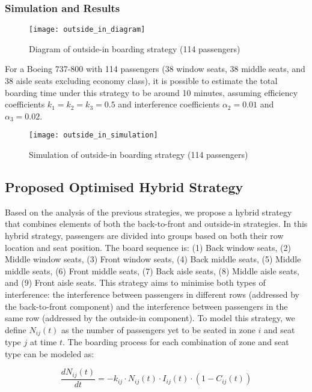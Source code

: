 \documentclass[12pt]{article}
\begin{document}
\subsubsection{Simulation and Results}

\begin{figure}[h]
    \centering
    \texttt{[image: outside\_in\_diagram]}
    \caption{Diagram of outside-in boarding strategy (114 passengers)}
    \label{fig:outside_in_diagram}
\end{figure}

For a Boeing 737-800 with 114 passengers (38 window seats, 38 middle seats, and 38 aisle seats excluding economy class), it is possible to estimate the total boarding time under this strategy to be around 10 minutes, assuming efficiency coefficients $k_1 = k_2 = k_3 = 0.5$ and interference coefficients $\alpha_2 = 0.01$ and $\alpha_3 = 0.02$.

\begin{figure}[h]
    \centering
    \texttt{[image: outside\_in\_simulation]}
    \caption{Simulation of outside-in boarding strategy (114 passengers)}
    \label{fig:outside_in_simulation}
\end{figure}

\subsection{Proposed Optimised Hybrid Strategy}

Based on the analysis of the previous strategies, we propose a hybrid strategy that combines elements of both the back-to-front and outside-in strategies. In this hybrid strategy, passengers are divided into groups based on both their row location and seat position. The board sequence is: (1) Back window seats, (2) Middle window seats, (3) Front window seats, (4) Back middle seats, (5) Middle middle seats, (6) Front middle seats, (7) Back aisle seats, (8) Middle aisle seats, and (9) Front aisle seats. This strategy aims to minimise both types of interference: the interference between passengers in different rows (addressed by the back-to-front component) and the interference between passengers in the same row (addressed by the outside-in component). To model this strategy, we define $N_{ij}(t)$ as the number of passengers yet to be seated in zone $i$ and seat type $j$ at time $t$. The boarding process for each combination of zone and seat type can be modeled as:

\begin{equation}
\frac{dN_{ij}(t)}{dt} = -k_{ij} \cdot N_{ij}(t) \cdot I_{ij}(t) \cdot (1 - C_{ij}(t))
\end{equation}
\end{document}
